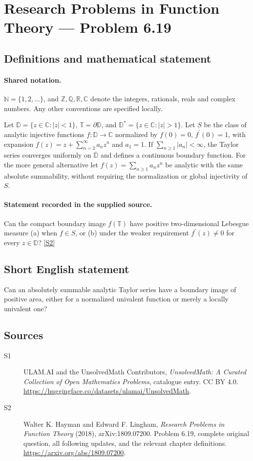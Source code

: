\documentclass[11pt]{book}
\newcommand{\sref}[2]{\hyperlink{source:#1:#2}{[S#2]}}
\begin{document}
\section{Research Problems in Function Theory — Problem 6.19}\label{statement}

\subsection{Definitions and mathematical statement}

\paragraph{Shared notation.}$\mathbb N=\{1,2,\ldots\}$, and $\mathbb Z,\mathbb Q,\mathbb R,\mathbb C$ denote the integers, rationals, reals and complex numbers. Any other conventions are specified locally.


Let $\mathbb D=\{z\in\mathbb C:|z|<1\}$, $\mathbb T=\partial\mathbb D$, and $\mathbb D^*=\{z\in\mathbb C:|z|>1\}$. Let $S$ be the class of analytic injective functions $f:\mathbb D\to\mathbb C$ normalized by $f(0)=0$, $f^{\prime}(0)=1$, with expansion $f(z)=z+\sum_{n=2}^{\infty}a_nz^n$ and $a_1=1$. If $\sum_{n\ge1}|a_n|<\infty$, the Taylor series converges uniformly on $\overline{\mathbb D}$ and defines a continuous boundary function. For the more general alternative let $f(z)=\sum_{n\ge1}a_nz^n$ be analytic with the same absolute summability, without requiring the normalization or global injectivity of $S$.
\paragraph{Statement recorded in the supplied source.}
Can the compact boundary image $f(\mathbb T)$ have positive two-dimensional Lebesgue measure (a) when $f\in S$, or (b) under the weaker requirement $f^{\prime}(z)\ne0$ for every $z\in\mathbb D$? \sref{statement}{2}
\subsection{Short English statement}
Can an absolutely summable analytic Taylor series have a boundary image of positive area, either for a normalized univalent function or merely a locally univalent one?
\subsection{Sources}
\begin{description}
\item[\hypertarget{source:statement:1}{S1}] ULAM.AI and the UnsolvedMath Contributors, \emph{UnsolvedMath: A Curated Collection of Open Mathematics Problems}, catalogue entry. CC BY 4.0. \url{https://huggingface.co/datasets/ulamai/UnsolvedMath}.
\item[\hypertarget{source:statement:2}{S2}] Walter K. Hayman and Edward F. Lingham, \emph{Research Problems in Function Theory} (2018), arXiv:1809.07200. Problem 6.19, complete original question, all following updates, and the relevant chapter definitions. \url{https://arxiv.org/abs/1809.07200}.
\end{description}
\label{end:statement}
\end{document}
